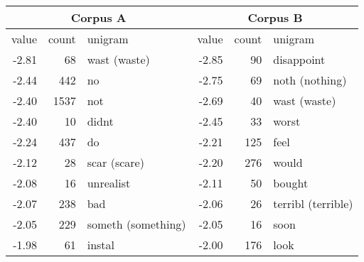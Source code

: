 \documentclass[japanese]{jnlp_1.3d}
\begin{document}
\begin{table}[t]
	\label{tab:feature_uniw}
	  \begin{center}
  \begin{tabular}{|r|r|l|r|r|l|} \hline
 \multicolumn{3}{|c|}{Corpus A} &  \multicolumn{3}{|c|}{Corpus B} \\ \hline  
value & count & unigram & value & count & unigram \\ \hline
-2.81 & 68 & wast (waste) & -2.85 & 90 & disappoint \\ 
-2.44 & 442 & no & -2.75 & 69 & noth (nothing)  \\ 
-2.40 & 1537 & not & -2.69 & 40 & wast (waste) \\ 
-2.40 & 10 & didnt & -2.45 & 33 & worst  \\ 
-2.24 & 437 & do & -2.21 & 125 & feel  \\ 
-2.12 & 28 & scar (scare) & -2.20 & 276 & would  \\ 
-2.08 & 16 & unrealist & -2.11 & 50 & bought  \\ 
-2.07 & 238 & bad & -2.06 & 26 & terribl (terrible)  \\ 
-2.05 & 229 & someth (something) & -2.05 & 16 & soon \\ 
-1.98 & 61 & instal  & -2.00 & 176 & look \\ \hline
\end{tabular}
  \end{center}
\end{table}
\end{document}
